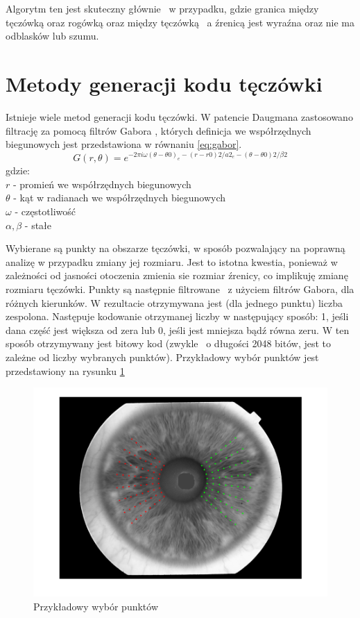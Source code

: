 Algorytm ten jest skuteczny głównie ~w przypadku, gdzie granica między tęczówką oraz rogówką oraz między tęczówką ~a źrenicą jest wyraźna oraz nie ma odblasków lub szumu.

\section{Metody generacji kodu tęczówki}
\label{sec:metodyGeneracjiKodu}

Istnieje wiele metod generacji kodu tęczówki. W patencie Daugmana zastosowano filtrację za pomocą filtrów Gabora \cite{Daugman}, których definicja we współrzędnych biegunowych jest przedstawiona w równaniu \ref{eq:gabor}.
\begin{equation}
\label{eq:gabor}
G(r,\theta) = e^{-2\pi i\omega (\theta - \theta 0)_{e}-(r - r0)2/a2_{e}-(\theta-\theta 0 )2/\beta 2}
\end{equation}
gdzie:\\
$r$ - promień we współrzędnych biegunowych \\
$\theta$ - kąt w radianach we współrzędnych biegunowych \\
$ \omega $ - częstotliwość \\
$ \alpha, \beta $ - stałe


Wybierane są punkty na obszarze tęczówki, w sposób pozwalający na poprawną analizę w przypadku zmiany jej rozmiaru. Jest to istotna kwestia, ponieważ w zależności od jasności otoczenia zmienia sie rozmiar źrenicy, co implikuję zmianę rozmiaru tęczówki. Punkty są następnie filtrowane ~z użyciem filtrów Gabora, dla różnych kierunków. W rezultacie otrzymywana jest (dla jednego punktu) liczba zespolona. Następuje kodowanie otrzymanej liczby w następujący sposób: 1, jeśli dana część jest większa od zera lub 0, jeśli jest mniejsza bądź równa zeru. W ten sposób otrzymywany jest bitowy kod (zwykle ~o długości 2048 bitów, jest to zależne od liczby wybranych punktów). Przykładowy wybór punktów jest przedstawiony na rysunku \ref{fig:przykladPunkty}

\begin{figure}
\begin{center}
\includegraphics[scale=0.5]{punkty.png}
\caption{Przykładowy wybór punktów}
\label{fig:przykladPunkty}
\end{center}
\end{figure}

